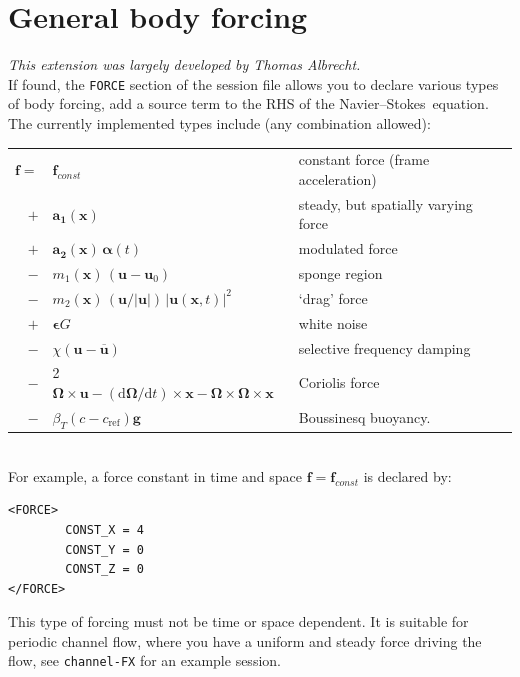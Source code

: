 \documentclass[11pt]{report}
\newcommand\cd{\mathrm{d}} \newcommand\cD{\mathrm{D}}
\newcommand\NavSto{Navier--Stokes}
\begin{document}
\section{General body forcing}
\label{sec.dns_ff}

\textsl{This extension was largely developed by Thomas Albrecht.}\\

\noindent
If found, the \verb+FORCE+ section of the session file allows you to
declare various types of body forcing, \ie add a source term
to the RHS of the \NavSto\ equation. The currently implemented types
include (any combination allowed):\\[1em]
\begin{tabular}{rll}
 $ \bm{f} =$ & $\bm{f}_{const}$                           
  & constant force (frame acceleration)\\
           $+$ & $\bm{a_1}(\bm{x})$                       
  & steady, but spatially varying force\\
           $+$ & $\bm{a_2}(\bm{x}) \, \bm{\alpha}(t) $ 
  & modulated force\\
           $-$ & $m_1(\bm{x})\,(\bm{u} - \bm{u}_0)$  
  & sponge region\\
           $-$ & $m_2(\bm{x})\,(\bm{u}/|\bm{u}|)\,|\bm{u}(\bm{x}, t)|^2$  
  & `drag' force  \\
           $+$ & $\bm{\epsilon} G$                        
  & white noise    \\
           $-$ & $\chi(\bm{u}-\overline{\bm{u}})$
  & selective frequency damping \\
           $-$ & 2 $\bm{\Omega} \times \bm{u} - 
                    (\cd\bm{\Omega}/\cd t) \times \bm{x} -
                    \bm{\Omega} \times \bm{\Omega} \times \bm{x}$  
  & Coriolis force \\
           $-$ & $\beta_T(c-c_\textrm{ref})\bm{g}$
  & Boussinesq buoyancy.                
\end{tabular}\\[1em]


\noindent For example, a force constant in time and space $\bm{f} =
\bm{f}_{const}$ is declared by:
\begin{verbatim}
<FORCE>
        CONST_X = 4
        CONST_Y = 0
        CONST_Z = 0
</FORCE>
\end{verbatim}
This type of forcing must not be time or space dependent. It is suitable
for periodic channel flow, where you have a uniform and steady force
driving the flow, see \verb+channel-FX+ for an example session.
\end{document}

